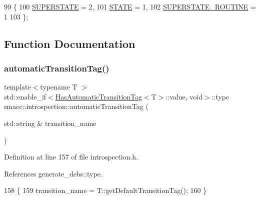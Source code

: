 \begin{DoxyCode}
99 \{
100     \hyperlink{namespacesmacc_1_1introspection_a710cf406873961567c11027582c7f720a4da54a31b31f1c863864fdee05fc35c8}{SUPERSTATE} = 2,
101     \hyperlink{namespacesmacc_1_1introspection_a710cf406873961567c11027582c7f720a2b848a8cc886d253d21a77c43cd50aae}{STATE} = 1,
102     \hyperlink{namespacesmacc_1_1introspection_a710cf406873961567c11027582c7f720a6d39c20504d2f2afe9c8c27351e61d20}{SUPERSTATE\_ROUTINE} = 1
103 \};
\end{DoxyCode}


\subsection{Function Documentation}
\mbox{\label{namespacesmacc_1_1introspection_ae031f62082f4e291e4933ee6f876b571}} 
\subsubsection{\texorpdfstring{automatic\+Transition\+Tag()}{automaticTransitionTag()}\hspace{0.1cm}{\footnotesize\ttfamily [1/2]}}
{\footnotesize\ttfamily template$<$typename T $>$ \\
std\+::enable\+\_\+if$<$\hyperlink{classsmacc_1_1introspection_1_1HasAutomaticTransitionTag}{Has\+Automatic\+Transition\+Tag}$<$T$>$\+::value, void$>$\+::type smacc\+::introspection\+::automatic\+Transition\+Tag (\begin{DoxyParamCaption}\item[{std\+::string \&}]{transition\+\_\+name }\end{DoxyParamCaption})}



Definition at line 157 of file introspection.\+h.



References generate\+\_\+debs\+::type.


\begin{DoxyCode}
158 \{
159     transition\_name = T::getDefaultTransitionTag();
160 \}
\end{DoxyCode}
\mbox{\label{namespacesmacc_1_1introspection_a0d72ea881eae4f1e0f71fe40b92f1f3e}} 
